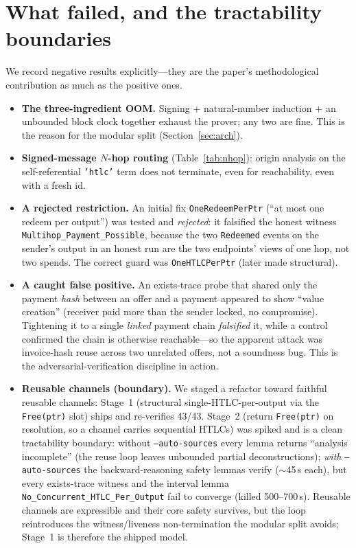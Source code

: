 \documentclass[11pt]{article}
\begin{document}
\section{What failed, and the tractability boundaries}
\label{sec:failed}

We record negative results explicitly---they are the paper's methodological
contribution as much as the positive ones.

\begin{itemize}
\item \textbf{The three-ingredient OOM.} Signing $+$ natural-number induction
  $+$ an unbounded block clock together exhaust the prover; any two are fine.
  This is the reason for the modular split (Section~\ref{sec:arch}).

\item \textbf{Signed-message $N$-hop routing} (Table~\ref{tab:nhop}): origin
  analysis on the self-referential \texttt{'htlc'} term does not terminate,
  even for reachability, even with a fresh id.

\item \textbf{A rejected restriction.} An initial fix \texttt{OneRedeemPerPtr}
  (``at most one redeem per output'') was tested and \emph{rejected}: it
  falsified the honest witness \texttt{Multihop_Payment_Possible}, because the
  two \texttt{Redeemed} events on the sender's output in an honest run are the
  two endpoints' views of one hop, not two spends. The correct guard was
  \texttt{OneHTLCPerPtr} (later made structural).

\item \textbf{A caught false positive.} \label{sec:falsepos}
  An exists-trace probe that shared only the payment \emph{hash} between an
  offer and a payment appeared to show ``value creation'' (receiver paid more
  than the sender locked, no compromise). Tightening it to a single
  \emph{linked} payment chain \emph{falsified} it, while a control confirmed the
  chain is otherwise reachable---so the apparent attack was invoice-hash reuse
  across two unrelated offers, not a soundness bug. This is the
  adversarial-verification discipline in action.

\item \textbf{Reusable channels (boundary).} We staged a refactor toward
  faithful reusable channels: Stage~1 (structural single-HTLC-per-output via the
  \texttt{Free(ptr)} slot) ships and re-verifies 43/43. Stage~2 (return
  \texttt{Free(ptr)} on resolution, so a channel carries sequential HTLCs) was
  spiked and is a clean tractability boundary: without \texttt{--auto-sources}
  every lemma returns ``analysis incomplete'' (the reuse loop leaves unbounded
  partial deconstructions); \emph{with} \texttt{--auto-sources} the
  backward-reasoning safety lemmas verify ($\sim$45\,s each), but every
  exists-trace witness and the interval lemma
  \texttt{No_Concurrent_HTLC_Per_Output} fail to converge (killed 500--700\,s).
  Reusable channels are expressible and their core safety survives, but the loop
  reintroduces the witness/liveness non-termination the modular split avoids;
  Stage~1 is therefore the shipped model.
\end{itemize}
\end{document}
